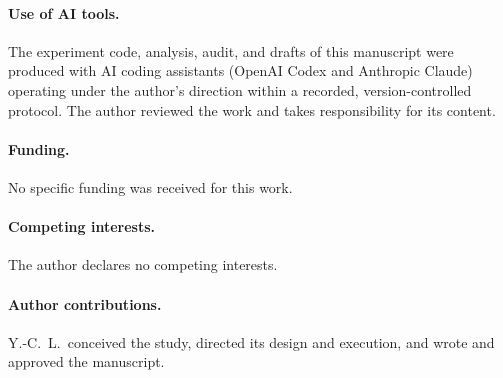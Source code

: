\documentclass[11pt,a4paper]{article}
\begin{document}
\paragraph{Use of AI tools.} The experiment code, analysis, audit, and drafts of this manuscript were produced with AI coding assistants (OpenAI Codex and Anthropic Claude) operating under the author's direction within a recorded, version-controlled protocol. The author reviewed the work and takes responsibility for its content.

\paragraph{Funding.} No specific funding was received for this work.

\paragraph{Competing interests.} The author declares no competing interests.

\paragraph{Author contributions.} Y.-C.~L.\ conceived the study, directed its design and execution, and wrote and approved the manuscript.

\small


\end{document}
